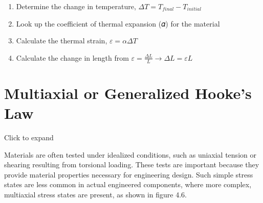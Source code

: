\documentclass[
  letterpaper,
  DIV=11,
  numbers=noendperiod]{scrreprt}
\theoremstyle{definition}
\theoremstyle{remark}
\begin{document}
\begin{tcolorbox}[enhanced jigsaw, leftrule=.75mm, colbacktitle=quarto-callout-warning-color!10!white, breakable, opacityback=0, colback=white, titlerule=0mm, toprule=.15mm, colframe=quarto-callout-warning-color-frame, coltitle=black, title={Step-by-step: Thermal Strain}, toptitle=1mm, bottomrule=.15mm, rightrule=.15mm, left=2mm, arc=.35mm, opacitybacktitle=0.6, bottomtitle=1mm]

\begin{enumerate}
\def\labelenumi{\arabic{enumi}.}
\item
  Determine the change in temperature,
  \(\Delta T=T_{final}-T_{initial}\)
\item
  Look up the coefficient of thermal expansion (𝛼) for the material
\item
  Calculate the thermal strain, \(\varepsilon=\alpha \Delta T\)
\item
  Calculate the change in length from
  \(\varepsilon=\frac{\Delta L}{L} \rightarrow \Delta L=\varepsilon L\)
\end{enumerate}

\end{tcolorbox}

\section{Multiaxial or Generalized Hooke's Law}\label{sec-4.7}

Click to expand

Materials are often tested under idealized conditions, such as uniaxial
tension or shearing resulting from torsional loading. These tests are
important because they provide material properties necessary for
engineering design. Such simple stress states are less common in actual
engineered components, where more complex, multiaxial stress states are
present, as shown in figure 4.6.
\end{document}

